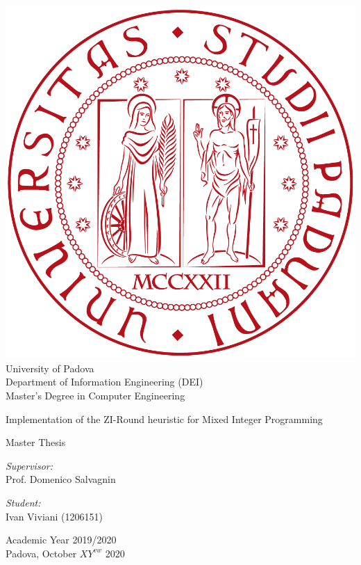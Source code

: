\documentclass[a4paper,12pt,twoside]{scrbook}
\begin{document}
	
\begin{titlepage}
	
\frontmatter

\begin{center}
	\includegraphics[scale=.10]{unipd.png}
	\\
	\vspace{1cm}
	\textsf{\LARGE University of Padova} \\
	\vspace{1cm}
	\textsf{\Large Department of Information Engineering (DEI)} \\
	\vspace{1cm} 
	\textsf{\Large Master's Degree in Computer Engineering} \\ %
	\vspace{0.8cm}
	\Huge \doublespacing \bfseries \begin{spacing}{1}{\textsf{Implementation of the ZI-Round heuristic for Mixed Integer Programming}}\end{spacing}
	\hfill
	\Large \bfseries \begin{spacing}{1}{\textsf{Master Thesis}}\end{spacing}
	\hfill
	\vspace{0.5cm}
	\begin{flushleft} 
		\large \emph{Supervisor:} \\
		\textsf{Prof. Domenico Salvagnin}
	\end{flushleft}
	\begin{flushright} 
		\large \emph{Student:} \\
		\textsf{Ivan Viviani (1206151)}
	\end{flushright}
	\hfill
	\vfill
	\small \textsf{Academic Year 2019/2020} \\
	\textsf{Padova, October $XY^{vw}$ 2020}
\end{center}
\end{titlepage}
\end{document}
